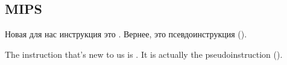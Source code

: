 ﻿\subsection{MIPS}




\ifdefined\RUSSIAN
Новая для нас инструкция это . Вернее, это псевдоинструкция ().
\fi

\ifdefined\ENGLISH
The instruction that's new to us is . It is actually the pseudoinstruction ().
\fi

